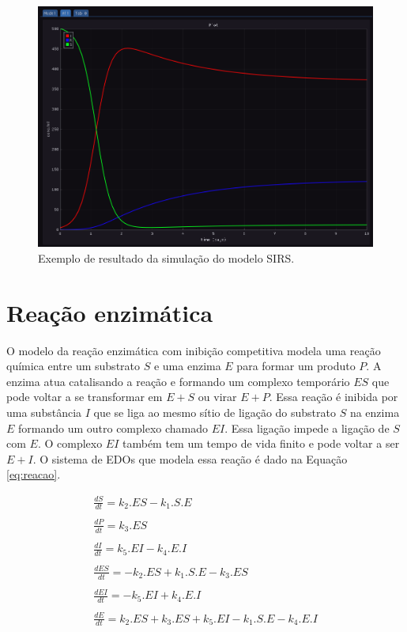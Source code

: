 \documentclass[
	12pt,				%
	openright,			%
	oneside,			%
	a4paper,			%
	main=brazil,
	english,			%
	]{ufsj-abntex2}
\begin{document}
\begin{figure}[h]
    \centering
    \includegraphics[width=\textwidth]{imgs/modelos/resultado-sirs.png} 
    \caption{Exemplo de resultado da simulação do modelo SIRS.}
    \label{fig:resultado-sirs}
\end{figure}

\section{Reação enzimática}

O modelo da reação enzimática com inibição competitiva modela uma reação química entre um substrato $S$ e uma enzima $E$ para formar um produto $P$. A enzima atua catalisando a reação e formando um complexo temporário $ES$ que pode voltar a se transformar em $E + S$ ou virar $E + P$. Essa reação é inibida por uma substância $I$ que se liga ao mesmo sítio de ligação do substrato $S$ na enzima $E$ formando um outro complexo chamado $EI$. Essa ligação impede a ligação de $S$ com $E$. O complexo $EI$ também tem um tempo de vida
finito e pode voltar a ser $E + I$.  
O sistema de EDOs que modela essa reação é dado na Equação \ref{eq:reacao}.

\begin{equation}\label{eq:reacao}
    \begin{array}{lr}
        \frac{dS}{dt} = k_2.ES - k_1.S.E 
        \\
        \\
        \frac{dP}{dt} = k_3.ES
        \\
        \\ 
        \frac{dI}{dt} = k_5.EI - k_4.E.I
        \\
        \\ 
        \frac{dES}{dt} = -k_2.ES + k_1.S.E - k_3.ES
        \\
        \\ 
        \frac{dEI}{dt} = -k_5.EI + k_4.E.I
        \\
        \\ 
        \frac{dE}{dt} = k_2.ES + k_3.ES + k_5.EI - k_1.S.E - k_4.E.I
    \end{array}
\end{equation}
\end{document}
